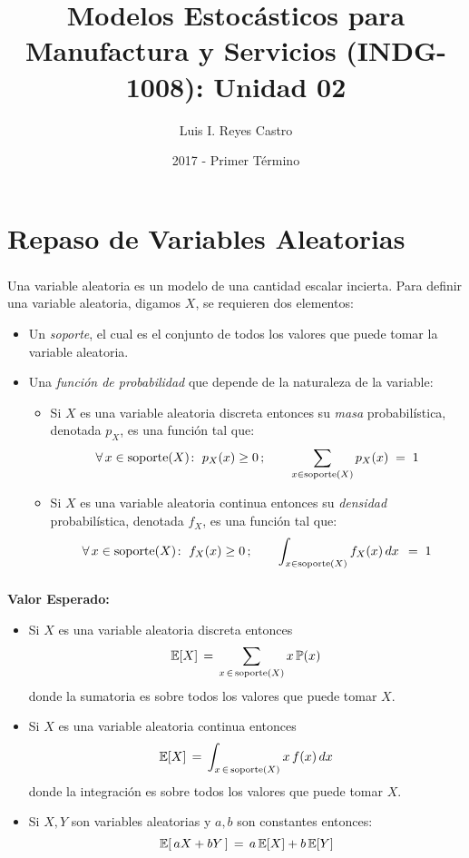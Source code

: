 \documentclass[ 10pt, xcolor = dvipsnames]{beamer}
\title[\shorttitle]{Modelos Estoc\'asticos para Manufactura y Servicios (INDG-1008): \textbf{Unidad 02} }
\author[L. I. Reyes Castro]{Luis I. Reyes Castro}
\institute[ESPOL]{\normalsize Escuela Superior Polit\'ecnica del Litoral (ESPOL) \\ Guayaquil - Ecuador}
\date[2017-T1]{2017 - Primer T\'ermino}
\begin{document}



\section{Repaso de Variables Aleatorias}

\begin{frame}[allowframebreaks]
\frametitle{\insertsection}

Una variable aleatoria es un modelo de una cantidad escalar incierta. Para definir una variable aleatoria, digamos $X$, se requieren dos elementos: 
\begin{itemize}
\item Un \emph{soporte}, el cual es el conjunto de todos los valores que puede tomar la variable aleatoria. 
\item Una \emph{funci\'on de probabilidad} que depende de la naturaleza de la variable: 
\begin{itemize}
\item Si $X$ es una variable aleatoria discreta entonces su \emph{masa} probabil\'istica, denotada $p_X$, es una funci\'on tal que: 
\[
\forall \, x \in \text{soporte}(X) \colon \; p_X(x) \geq 0 \, ;
\qquad
\sum_{x \in \text{soporte}(X)} p_X(x) \; = \; 1
\]
\item Si $X$ es una variable aleatoria continua entonces su \emph{densidad} probabil\'istica, denotada $f_X$, es una funci\'on tal que: 
\[
\forall \, x \in \text{soporte}(X) \colon \; f_X(x) \geq 0 \, ;
\qquad
\int_{x \in \text{soporte}(X)} f_X(x) \, dx \, \; = \; 1
\]
\end{itemize}
\end{itemize}

\end{frame}

\begin{frame}[allowframebreaks]
\frametitle{\insertsection}

\textbf{Valor Esperado:}
\begin{itemize}
\item Si $X$ es una variable aleatoria discreta entonces 
\[
\mathbb{E}[X] \, = \, \sum_{ x \, \in \, \text{soporte}(X) } x \, \mathbb{P}(x)
\]
donde la sumatoria es sobre todos los valores que puede tomar $X$. 
\item Si $X$ es una variable aleatoria continua entonces 
\[
\mathbb{E}[X] \, = \, \int_{ x \, \in \, \text{soporte}(X) } x \, f(x) \, dx
\]
donde la integraci\'on es sobre todos los valores que puede tomar $X$. 
\item Si $X,Y$ son variables aleatorias y $a,b$ son constantes entonces: 
\[
\mathbb{E}[ \, a X + b Y \, ] \, = \, a \, \mathbb{E}[X] + b \, \mathbb{E}[Y]
\]
\end{itemize}

\end{frame}
\end{document}
